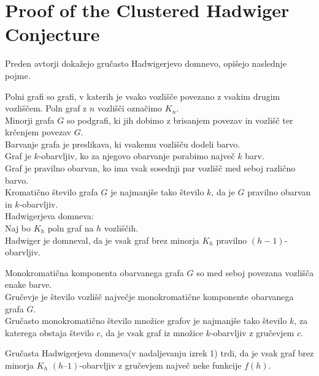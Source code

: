 \documentclass{article}
\begin{document}
\section{Proof of the Clustered Hadwiger Conjecture}
Preden avtorji dokažejo gručasto Hadwigerjevo domnevo, opišejo naslednje pojme.



Polni grafi so grafi, v katerih je vsako vozlišče povezano z vsakim drugim vozliščem. Poln graf z $n$ vozlišči označimo $K_n$.\\                                                           
Minorji grafa $G$ so podgrafi, ki jih dobimo z brisanjem povezav in vozlišč ter krčenjem povezav $G$.\\
Barvanje grafa je preslikava, ki vsakemu vozlišču dodeli barvo.\\
Graf je $k$-obarvljiv, ko za njegovo obarvanje porabimo največ $k$ barv.\\
Graf je pravilno obarvan, ko ima vsak sosednji par vozlišč med seboj različno barvo.\\
Kromatično število grafa $G$ je najmanjše tako število $k$, da je $G$ pravilno obarvan in $k$-obarvljiv.\\

Hadwigerjeva domneva:\\
Naj bo $K_h$ poln graf na $h$ vozliščih.\\
Hadwiger je domneval, da je vsak graf brez minorja $K_h$ pravilno $(h - 1)$-obarvljiv.

Monokromatična komponenta obarvanega grafa $G$ so med seboj povezana vozlišča enake barve.\\
Gručevje je število vozlišč največje monokromatične komponente obarvanega grafa $G$.\\
Gručasto monokromatično število množice grafov je najmanjše tako število $k$, za katerega obstaja število $c$, da je vsak graf iz množice $k$-obarvljiv z gručevjem $c$.

Gručasta Hadwigerjeva domneva(v nadaljevanju izrek 1) trdi, da je vsak graf brez minorja $K_h$ $(h – 1)$-obarvljiv z gručevjem največ neke funkcije $f(h)$.\\
\end{document}
